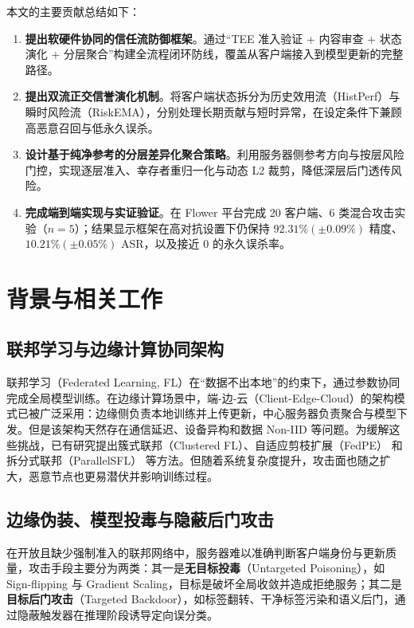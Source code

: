 \documentclass[11pt, a4paper, UTF8, fontset=fandol]{ctexart}
\begin{document}
本文的主要贡献总结如下：
\begin{enumerate}
    \item \textbf{提出软硬件协同的信任流防御框架}。通过“TEE 准入验证 + 内容审查 + 状态演化 + 分层聚合”构建全流程闭环防线，覆盖从客户端接入到模型更新的完整路径。
    \item \textbf{提出双流正交信誉演化机制}。将客户端状态拆分为历史效用流（HistPerf）与瞬时风险流（RiskEMA），分别处理长期贡献与短时异常，在设定条件下兼顾高恶意召回与低永久误杀。
    \item \textbf{设计基于纯净参考的分层差异化聚合策略}。利用服务器侧参考方向与按层风险门控，实现逐层准入、幸存者重归一化与动态 L2 裁剪，降低深层后门透传风险。
    \item \textbf{完成端到端实现与实证验证}。在 Flower 平台完成 20 客户端、6 类混合攻击实验（$n=5$）；结果显示框架在高对抗设置下仍保持 $92.31\% (\pm 0.09\%)$ 精度、$10.21\% (\pm 0.05\%)$ ASR，以及接近 0 的永久误杀率。
\end{enumerate}


\section{背景与相关工作}

\subsection{联邦学习与边缘计算协同架构}
联邦学习（Federated Learning, FL）在“数据不出本地”的约束下，通过参数协同完成全局模型训练。在边缘计算场景中，端-边-云（Client-Edge-Cloud）的架构模式已被广泛采用：边缘侧负责本地训练并上传更新，中心服务器负责聚合与模型下发。但是该架构天然存在通信延迟、设备异构和数据 Non-IID 等问题。为缓解这些挑战，已有研究提出簇式联邦（Clustered FL）\cite{r9_clustered}、自适应剪枝扩展（FedPE）\cite{fedpe} 和拆分式联邦（ParallelSFL）\cite{parallelsfl} 等方法。但随着系统复杂度提升，攻击面也随之扩大，恶意节点也更易潜伏并影响训练过程。

\subsection{边缘伪装、模型投毒与隐蔽后门攻击}
在开放且缺少强制准入的联邦网络中，服务器难以准确判断客户端身份与更新质量，攻击手段主要分为两类：其一是\textbf{无目标投毒}（Untargeted Poisoning），如 Sign-flipping 与 Gradient Scaling，目标是破坏全局收敛并造成拒绝服务；其二是\textbf{目标后门攻击}（Targeted Backdoor），如标签翻转、干净标签污染和语义后门，通过隐蔽触发器在推理阶段诱导定向误分类。
\end{document}
